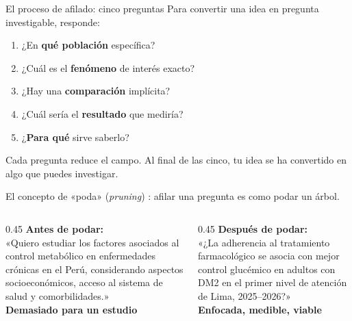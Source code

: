 \documentclass[12pt, aspectratio=169]{beamer}
\begin{document}
\begin{frame}{El proceso de afilado: cinco preguntas}
  Para convertir una idea en pregunta investigable, responde:

  \medskip
  \begin{enumerate}
    \item ¿En \textbf{qué población} específica?
    \item ¿Cuál es el \textbf{fenómeno} de interés exacto?
    \item ¿Hay una \textbf{comparación} implícita?
    \item ¿Cuál sería el \textbf{resultado} que mediría?
    \item ¿\textbf{Para qué} sirve saberlo?
  \end{enumerate}

  \medskip
  \begin{keybox}
    \small
    Cada pregunta reduce el campo. Al final de las cinco,
    tu idea se ha convertido en algo que puedes investigar.
  \end{keybox}
\end{frame}

\begin{frame}{El concepto de «poda» (\textit{pruning})}
  \textcite{Vandenbroucke2018_ideas}: afilar una pregunta es como podar un árbol.

  \medskip
  \begin{columns}[T]
    \begin{column}{0.45\textwidth}
      \textbf{Antes de podar:}\\[4pt]
      \small
      «Quiero estudiar los factores asociados
      al control metabólico en enfermedades
      crónicas en el Perú, considerando
      aspectos socioeconómicos, acceso al
      sistema de salud y comorbilidades.»\\[6pt]
      \textcolor{boxOrange}{\textbf{Demasiado para un estudio}}
    \end{column}
    \begin{column}{0.45\textwidth}
      \textbf{Después de podar:}\\[4pt]
      \small
      «¿La adherencia al tratamiento
      farmacológico se asocia con mejor
      control glucémico en adultos con DM2
      en el primer nivel de atención de
      Lima, 2025--2026?»\\[6pt]
      \textcolor{boxGreen}{\textbf{Enfocada, medible, viable}}
    \end{column}
  \end{columns}
\end{frame}
\end{document}
